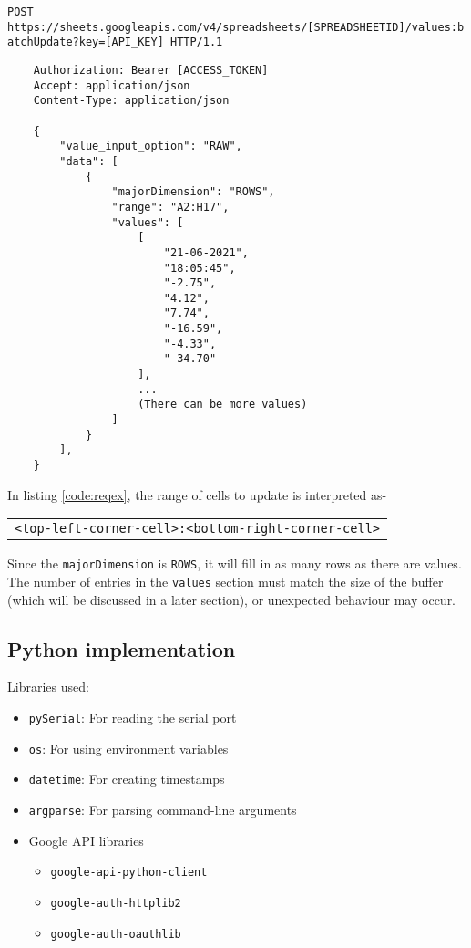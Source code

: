 \documentclass[./main.tex]{subfiles}
\begin{document}
\begin{code}
    {\Smallfont \texttt{POST https://sheets.googleapis.com/v4/spreadsheets/[SPREADSHEETID]/values:batchUpdate?key=[API_KEY] HTTP/1.1}}
    \begin{verbatim}
    Authorization: Bearer [ACCESS_TOKEN]
    Accept: application/json
    Content-Type: application/json

    {
        "value_input_option": "RAW",
        "data": [
            {
                "majorDimension": "ROWS",
                "range": "A2:H17",
                "values": [
                    [
                        "21-06-2021",
                        "18:05:45",
                        "-2.75",
                        "4.12",
                        "7.74",
                        "-16.59",
                        "-4.33",
                        "-34.70"
                    ],
                    ...
                    (There can be more values)
                ]
            }
        ],
    }
    \end{verbatim}
    \label{code:reqex}
\end{code}
\vspace{0.5cm}

In listing \ref{code:reqex}, the range of cells to update is interpreted as-
\begin{code}
    \begin{table}[H]
        \centering
        \begin{tabular}{c}
        \texttt{<top-left-corner-cell>:<bottom-right-corner-cell>}
        \end{tabular}
    \end{table}
\end{code}
Since the \texttt{majorDimension} is \texttt{ROWS}, it will fill in as many
rows as there are values. The number of entries in the \texttt{values} section
must match the size of the buffer (which will be discussed in a later section),
or unexpected behaviour may occur.

\subsection{Python implementation}
Libraries used:
\begin{itemize}
    \item \texttt{pySerial}: For reading the serial port
    \item \texttt{os}: For using environment variables
    \item \texttt{datetime}: For creating timestamps
    \item \texttt{argparse}: For parsing command-line arguments
    \item Google API libraries
        \begin{itemize}
            \item \texttt{google-api-python-client}
            \item \texttt{google-auth-httplib2}
            \item \texttt{google-auth-oauthlib}
        \end{itemize}
\end{itemize}
\end{document}
